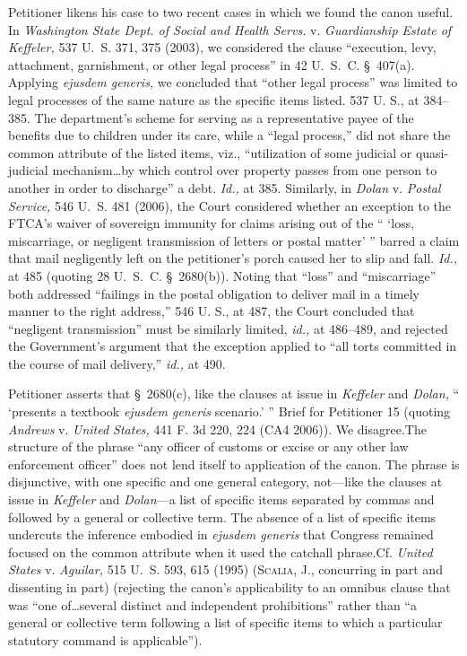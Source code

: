   Petitioner likens his case to two recent cases in which we found the canon useful. In \emph{Washington State Dept. of Social and Health Servs.} v. \emph{Guardianship Estate of Keffeler,} 537 U.~S. 371, 375 (2003), we considered the clause ``execution, levy, attachment, garnishment, or other legal process'' in 42 U.~S.~C. \S~407(a). Applying \emph{ejusdem generis,} we concluded that ``other legal process'' was limited to legal processes of the same nature as the specific items listed. 537 U. S., at 384--385. The department's scheme for serving as a representative payee of the benefits due to children under its care, while a ``legal process,'' did not share the common attribute of the listed items, viz., ``utilization of some judicial or quasi-judicial mechanism\dots by which control over property passes from one person to another in order to discharge'' a debt. \emph{Id.,} at 385. Similarly, in \emph{Dolan} v. \emph{Postal Service,} 546 U.~S. 481 (2006), the Court considered whether an exception to the FTCA's waiver of sovereign immunity for claims arising out of the `` ‘loss, miscarriage, or negligent transmission of letters or postal matter' '' barred a claim that mail negligently left on the petitioner's porch caused her to slip and fall. \emph{Id.,} at 485 (quoting 28 U.~S.~C. \S~2680(b)). Noting that ``loss'' and ``miscarriage'' both addressed ``failings in the postal obligation to deliver mail in a timely manner to the right address,'' 546 U. S., at 487, the Court concluded that ``negligent transmission'' must be similarly limited, \emph{id.,} at 486--489, and rejected the Government's argument that the exception applied to ``all torts committed in the course of mail delivery,'' \emph{id.,} at 490.

  Petitioner asserts that \S~2680(c), like the clauses at issue in \emph{Keffeler} and \emph{Dolan,} `` ‘presents a textbook \emph{ejusdem generis} scenario.' '' Brief for Petitioner 15 (quoting \emph{Andrews} v. \emph{United States,} 441 F. 3d 220, 224 (CA4 2006)). We disagree.\starpage  The structure of the phrase ``any officer of customs or excise or any other law enforcement officer'' does not lend itself to application of the canon. The phrase is disjunctive, with one specific and one general category, not---like the clauses at issue in \emph{Keffeler} and \emph{Dolan}---a list of specific items separated by commas and followed by a general or collective term. The absence of a list of specific items undercuts the inference embodied in \emph{ejusdem generis} that Congress remained focused on the common attribute when it used the catchall phrase.Cf. \emph{United States} v. \emph{Aguilar,} 515 U.~S. 593, 615 (1995) (\textsc{Scalia,} J., concurring in part and dissenting in part) (rejecting the canon's applicability to an omnibus clause that was ``one of\dots several distinct and independent prohibitions'' rather than ``a general or collective term following a list of specific items to which a particular statutory command is applicable'').

